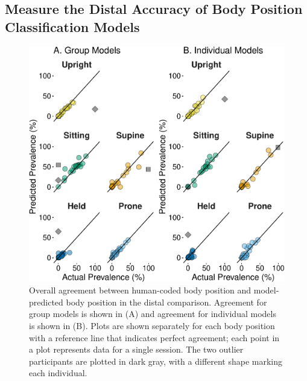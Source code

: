 \documentclass[
  man]{apa6}
\begin{document}
\renewcommand{\arraystretch}{.75}

\hypertarget{measure-the-distal-accuracy-of-body-position-classification-models}{%
\subsection{Measure the Distal Accuracy of Body Position Classification Models}\label{measure-the-distal-accuracy-of-body-position-classification-models}}

\begin{figure}

{\centering \includegraphics{manuscript_files/figure-latex/part2overall-1} 

}

\caption{Overall agreement between human-coded body position and model-predicted body position in the distal comparison. Agreement for group models is shown in (A) and agreement for individual models is shown in (B). Plots are shown separately for each body position with a reference line that indicates perfect agreement; each point in a plot represents data for a single session. The two outlier participants are plotted in dark gray, with a different shape marking each individual. }\label{fig:part2overall}
\end{figure}
\end{document}
